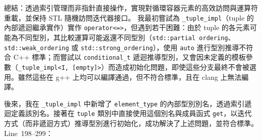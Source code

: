 \documentclass[a4paper,12pt]{article}
\begin{document}
總結：透過索引管理而非指針直接操作，實現對循環容器元素的高效訪問與運算符重載，並保持 STL 隨機訪問迭代器接口。
我最初嘗試為 \verb|_tuple_impl|（tuple 的內部遞迴繼承實作）實作 \verb|operator<=>|，但遇到若干困難：由於 tuple 的各元素可能為不同型別，其比較運算可能返還不同型別（\verb|std::partial ordering|、\verb|std::weak_ordering| 或 \verb|std::strong_ordering|），使用 \verb|auto| 進行型別推導不符合 C++ 標準；而嘗試以 \verb|conditional_t| 遞迴推導型別，又會因未定義的模板參數（\verb|_tuple_impl<I, [empty]>|）而造成初始化問題，即使這些分支最終不會被選用。雖然這些在 g++ 上均可以編譯通過，但不符合標準，且在 clang 上無法編譯。

後來，我在 \verb|_tuple_impl| 中新增了 \verb|element_type| 的內部型別別名，透過索引遞迴定義該別名。接著在 \verb|tuple| 類別中直接使用這個別名與成員函式 \verb|get|，以迭代方式（而非遞迴方式）推導型別進行初始化，成功解決了上述問題，並符合標準。
Line~198--299：
\end{document}
